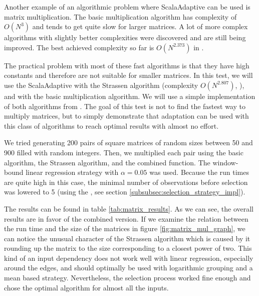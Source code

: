 Another example of an algorithmic problem where ScalaAdaptive can be used is matrix multiplication. The basic multiplication algorithm has complexity of $O(N^3)$ and tends to get quite slow for larger matrices. A lot of more complex algorithms with slightly better complexities were discovered and are still being improved. The best achieved complexity so far is $O(N^{2.373})$ in \cite{williams_multiplying_2012}.

The practical problem with most of these fast algorithms is that they have high constants and therefore are not suitable for smaller matrices. In this test, we will use the ScalaAdaptive with the Strassen algorithm (complexity $O(N^{2.807})$, \cite{strassen_gaussian_1969}), and with the basic multiplication algorithm. We will use a simple implementation of both algorithms from \cite{noauthor_jlinalg_nodate}. The goal of this test is not to find the fastest way to multiply matrices, but to simply demonstrate that adaptation can be used with this class of algorithms to reach optimal results with almost no effort.

We tried generating 200 pairs of square matrices of random sizes between 50 and 900 filled with random integers. Then, we multiplied each pair using the basic algorithm, the Strassen algorithm, and the combined function. The window-bound linear regression strategy with $\alpha = 0.05$ was used. Because the run times are quite high in this case, the minimal number of observations before selection was lowered to 5 (using the , see section \ref{subsubsec:selection_strategy_impl}). 

The results can be found in table \ref{tab:matrix_results}. As we can see, the overall results are in favor of the combined version. If we examine the relation between the run time and the size of the matrices in figure \ref{fig:matrix_mul_graph}, we can notice the unusual character of the Strassen algorithm which is caused by it rounding up the matrix to the size corresponding to a closest power of two. This kind of an input dependency does not work well with linear regression, especially around the edges, and should optimally be used with logarithmic grouping and a mean based strategy. Nevertheless, the selection process worked fine enough and chose the optimal algorithm for almost all the inputs.

